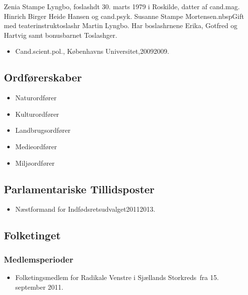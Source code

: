 \documentclass[11pt, a4paper]{awesome-cv}
\begin{document}
\makecvheader[R]
\makelettertitle
\begin{cvletter}
Zenia Stampe Lyngbo, foslashdt 30. marts 1979 i Roskilde, datter af cand.mag. Hinrich Birger Heide Hansen og cand.psyk. Susanne Stampe Mortensen.nbspGift med teaterinstruktoslashr Martin Lyngbo. Har boslashrnene Erika, Gotfred og Hartvig samt bonusbarnet Toslashger.

\begin{itemize}
\item Cand.scient.pol., Københavns Universitet,20092009.
\end{itemize}
\subsection*{Ordførerskaber}
\begin{itemize}
\item Naturordfører
\item Kulturordfører
\item Landbrugsordfører
\item Medieordfører
\item Miljøordfører
\end{itemize}
\subsection*{Parlamentariske Tillidsposter}
\begin{itemize}
\item Næstformand for Indfødsretsudvalget20112013.
\end{itemize}
\subsection*{Folketinget}
\subsubsection*{Medlemsperioder}
\begin{itemize}
\item Folketingsmedlem for Radikale Venstre i Sjællands Storkreds fra 15. september 2011.
\end{itemize}

\end{cvletter}
\end{document}
